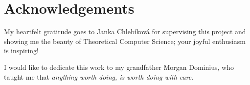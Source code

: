 \section*{Acknowledgements}

My heartfelt gratitude goes to Janka Chlebíková for supervising this project and showing me the beauty of Theoretical Computer Science; your joyful enthusiasm is inspiring!

I would like to dedicate this work to my grandfather Morgan Dominius, who taught me that \textit{anything worth doing, is worth doing with care}.
